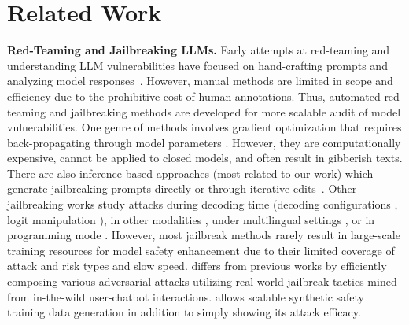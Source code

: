 \section{Related Work}

\textbf{Red-Teaming and Jailbreaking LLMs.}
Early attempts at red-teaming and understanding LLM vulnerabilities have focused on hand-crafting prompts and analyzing model responses~\citep{hh-rlhf-preference, hh-rlhf, openai2024gpt4}. However, manual methods are limited in scope and efficiency due to the prohibitive cost of human annotations. Thus, automated red-teaming and jailbreaking methods are developed for more scalable audit of model vulnerabilities. One genre of methods involves gradient optimization that requires back-propagating through model parameters \citep{gcg,gbda,coldattack,schwinn2024soft}. However, they are computationally expensive, cannot be applied to closed models, and often result in gibberish texts. There are also inference-based approaches (most related to our work) which generate jailbreaking prompts directly or through iterative edits~\citep{pair,liu2023autodan,lapid2023open,li2024deepinception,red-teaming-lm-w-lm, casper2023explore,tap,yu2023gptfuzzer,promptpacker,yuan2023gpt4,zeng2024johnny,Deng_2024}. Other jailbreaking works study attacks during decoding time (\eg decoding configurations \citep{huang2023catastrophic}, logit manipulation \citep{zhao2024weaktostrong}), in other modalities \cite{shayegani2024jailbreak}, under multilingual settings \citep{deng2024multilingual,yong2024lowresource,qiu2023latent}, or in programming mode \cite{kang2023exploiting}. However, most jailbreak methods rarely result in large-scale training resources for model safety enhancement due to their limited coverage of attack and risk types and slow speed. \method differs from previous works by efficiently composing various adversarial attacks utilizing real-world jailbreak tactics mined from in-the-wild user-chatbot interactions. \method allows scalable synthetic safety training data generation in addition to simply showing its attack efficacy.

